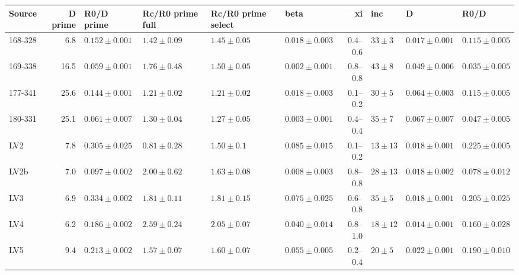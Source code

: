 \begin{tabular}{lrllllrlll}
Source & D prime & R0/D prime & Rc/R0 prime full & Rc/R0 prime select & beta & xi & inc & D & R0/D\\
\hline
168-328 & 6.8 & \(0.152 \pm 0.001\) & \(1.42 \pm 0.09\) & \(1.45 \pm 0.05\) & \(0.018 \pm 0.003\) & 0.4--0.6 & \(33 \pm 3\) & \(0.017 \pm 0.001\) & \(0.115 \pm 0.005\)\\
169-338 & 16.5 & \(0.059 \pm 0.001\) & \(1.76 \pm 0.48\) & \(1.50 \pm 0.05\) & \(0.002 \pm 0.001\) & 0.8--0.8 & \(43 \pm 8\) & \(0.049 \pm 0.006\) & \(0.035 \pm 0.005\)\\
177-341 & 25.6 & \(0.144 \pm 0.001\) & \(1.21 \pm 0.02\) & \(1.21 \pm 0.02\) & \(0.018 \pm 0.003\) & 0.1--0.2 & \(30 \pm 5\) & \(0.064 \pm 0.003\) & \(0.115 \pm 0.005\)\\
180-331 & 25.1 & \(0.061 \pm 0.007\) & \(1.30 \pm 0.04\) & \(1.27 \pm 0.05\) & \(0.003 \pm 0.001\) & 0.4--0.4 & \(35 \pm 7\) & \(0.067 \pm 0.007\) & \(0.047 \pm 0.005\)\\
LV2 & 7.8 & \(0.305 \pm 0.025\) & \(0.81 \pm 0.28\) & \(1.50 \pm 0.1\) & \(0.085 \pm 0.015\) & 0.1--0.2 & \(13 \pm 13\) & \(0.018 \pm 0.001\) & \(0.225 \pm 0.005\)\\
LV2b & 7.0 & \(0.097 \pm 0.002\) & \(2.00 \pm 0.62\) & \(1.63 \pm 0.08\) & \(0.008 \pm 0.003\) & 0.8--0.8 & \(28 \pm 13\) & \(0.018 \pm 0.002\) & \(0.078 \pm 0.012\)\\
LV3 & 6.9 & \(0.334 \pm 0.002\) & \(1.81 \pm 0.11\) & \(1.81 \pm 0.15\) & \(0.075 \pm 0.025\) & 0.6--0.8 & \(35 \pm 5\) & \(0.018 \pm 0.001\) & \(0.205 \pm 0.025\)\\
LV4 & 6.2 & \(0.186 \pm 0.002\) & \(2.59 \pm 0.24\) & \(2.05 \pm 0.07\) & \(0.040 \pm 0.014\) & 0.8--1.0 & \(18 \pm 12\) & \(0.014 \pm 0.001\) & \(0.160 \pm 0.028\)\\
LV5 & 9.4 & \(0.213 \pm 0.002\) & \(1.57 \pm 0.07\) & \(1.60 \pm 0.07\) & \(0.055 \pm 0.005\) & 0.2--0.4 & \(20 \pm 5\) & \(0.022 \pm 0.001\) & \(0.190 \pm 0.010\)\\
\end{tabular}
